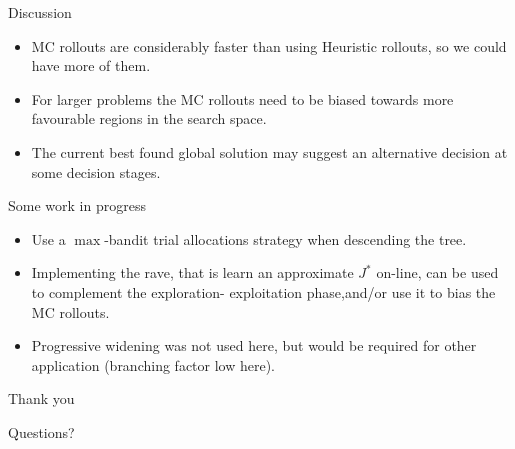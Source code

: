 \documentclass[
	mode=present,
	paper=screen,
	orient=landscape,
	display=slides,
	style=simple
	]{powerdot}
\begin{document}
\begin{slide}{Discussion}

\begin{itemize}
 \item MC rollouts are considerably faster than using Heuristic rollouts, so we could have more of them.\pause
 \item For larger problems the MC rollouts need to be biased towards more favourable regions in the search space.\pause
 \item The current best found global solution may suggest an alternative decision at some decision stages.\pause
\end{itemize}

Some work in progress

\begin{itemize}
\item Use a $\max$-bandit trial allocations strategy when descending the tree.\pause
\item Implementing the rave, that is learn an approximate $J^*$ on-line, can be used to complement the 
exploration- exploitation phase,\pause and/or use it to bias the MC rollouts.\pause
\item Progressive widening was not used here, but would be required for other application (branching factor low here).
\end{itemize}



\end{slide}


\begin{slide}{Thank you}
\vspace{1in}
\begin{center}
Questions?
\end{center}
\end{slide}
\end{document}
